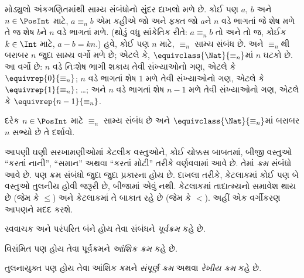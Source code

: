 \begin{ex}
મોડ્યુલો અંકગણિતમાંથી સામ્ય સંબંધોનો સુંદર દાખલો મળે છે.
કોઈ પણ $a$, $b$ અને $n \in \PosInt$ માટે,
$a \equiv_n b$ એમ કહીએ જો અને ફક્ત જો $a$ને $n$ વડે
ભાગતાં જે શેષ મળે તે જ શેષ $b$ને $n$ વડે ભાગતાં મળે.
(થોડું વધુ સાંકેતિક રીતે: $a \equiv_n b$ તો અને તો જ,
કોઈક $k \in \Int$ માટે, $a - b = kn$.)
હવે, કોઈ પણ $n$ માટે, $\equiv_n$ સામ્ય સંબંધ છે.
અને $\equiv_n$થી બરાબર $n$ જુદા સામ્ય વર્ગો મળે છે;
એટલે કે, $\equivclass{\Nat}{\equiv_n}$માં $n$ ઘટકો છે.
આ વર્ગો છે: $n$ વડે નિઃશેષ ભાગી શકાય તેવી સંખ્યાઓનો ગણ,
એટલે કે $\equivrep{0}{\equiv_n}$; $n$ વડે ભાગતાં
શેષ $1$ મળે તેવી સંખ્યાઓનો ગણ, એટલે કે
$\equivrep{1}{\equiv_n}$; \ldots; અને $n$ વડે ભાગતાં
શેષ $n-1$ મળે તેવી સંખ્યાઓનો ગણ, એટલે કે
$\equivrep{n-1}{\equiv_n}$.
\end{ex}

\begin{prob}
દરેક $n \in \PosInt$ માટે $\equiv_n$ સામ્ય સંબંધ છે અને
$\equivclass{\Nat}{\equiv_n}$માં બરાબર $n$ સભ્યો છે તે દર્શાવો.
\end{prob}
\endgroup


\begingroup
\makeatletter{}\makeatother

\label{guunit:OLP-0016}


\begin{explain}
આપણી ઘણી સરખામણીઓમાં કેટલીક વસ્તુઓને, કોઈ ચોક્કસ બાબતમાં,
બીજી વસ્તુઓ “કરતાં નાની”, “સમાન” અથવા “કરતાં મોટી”
તરીકે વર્ણવવામાં આવે છે. તેમાં \emph{ક્રમ} સંબંધો આવે છે.
પણ ક્રમ સંબંધો જુદા જુદા પ્રકારના હોય છે. દાખલા તરીકે,
કેટલાકમાં કોઈ પણ બે વસ્તુઓ તુલનીય હોવી જરૂરી છે,
બીજામાં એવું નથી. કેટલાકમાં તાદાત્મ્યનો સમાવેશ થાય છે
(જેમ કે $\le$) અને કેટલાકમાં તે બાકાત રહે છે (જેમ કે $<$).
અહીં એક વર્ગીકરણ આપણને મદદ કરશે.
\end{explain}

\begin{defn}[પૂર્વક્રમ]
સ્વવાચક અને પરંપરિત બંને હોય તેવા સંબંધને \emph{પૂર્વક્રમ} કહે છે.
\end{defn}

\begin{defn}[આંશિક ક્રમ]
વિસંમિત પણ હોય તેવા પૂર્વક્રમને \emph{આંશિક ક્રમ} કહે છે.
\end{defn}

\begin{defn}[રેખીય ક્રમ]
તુલનાયુક્ત પણ હોય તેવા આંશિક ક્રમને \emph{સંપૂર્ણ ક્રમ}
અથવા \emph{રેખીય ક્રમ} કહે છે.
\end{defn}


